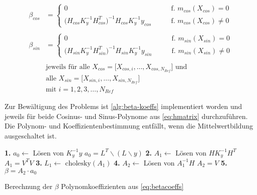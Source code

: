 \begin{align}\label{eq:betacoeffs}
	\beta_{cos} &= 
		\begin{cases}
			0 																	 &\qquad \text{f. } m_{cos}(X_{cos}) = 0\\
			\big( H_{cos} K_y^{-1} H_{cos}^T \big)^{-1} H_{cos} K_y^{-1} y_{cos} &\qquad \text{f. } m_{cos}(X_{cos}) \ne 0
		\end{cases} \nonumber \\
	\\
	\beta_{sin} &= 
		\begin{cases}
			0 																	 &\qquad \text{f. } m_{sin}(X_{sin}) = 0\\
			\big( H_{sin} K_y^{-1} H_{sin}^T \big)^{-1} H_{sin} K_y^{-1} y_{sin} &\qquad \text{f. } m_{sin}(X_{sin}) \ne 0
		\end{cases} \nonumber \\
	\nonumber \\
	& \text{jeweils für alle } X_{cos} = \big[ X_{cos,i},\dots, X_{cos,N_{Ref}} \big] \text{ und } \nonumber \\
	& \text{alle } X_{sin} = \big[ X_{sin,i},\dots, X_{sin,N_{Ref}} \big] \nonumber \\
	& \text{mit } i = 1,2,3,\ldots,N_{Ref} \nonumber
\end{align}


Zur Bewältigung des Problems ist \autoref{alg:beta-koeffs} implementiert worden und jeweils für beide Cosinus- und Sinus-Polynome aus \autoref{eq:hmatrix} durchzuführen. Die Polynom- und Koeffizientenbestimmung entfällt, wenn die Mittelwertbildung ausgeschaltet ist.


\begin{algorithm}[hp]
	\SetAlgoLined
	\textbf{1.} $a_0 \leftarrow$ Lösen von $K_y^{-1} y$\;
	\Indp 
		$a_0 = L^T \backslash (L \backslash y)$\;
	\Indm
	\textbf{2.} $A_1 \leftarrow$ Lösen von $H K_y^{-1} H^T$\;
	\Indp
		$A_1 = V^T V$\;
	\Indm
	\textbf{3.} $L_1 \leftarrow$ $\text{cholesky}(A_1)$\;
	\textbf{4.} $A_2 \leftarrow$ Lösen von $A_1^{-1} H$\;
	\Indp
		$A_2 = V$\;
	\Indm
	\textbf{5.} $\beta = A_2 \cdot a_0$\;
	\caption{Berechnung der $\beta$ Polynomkoeffizienten aus \autoref{eq:betacoeffs}}
	\label{alg:beta-koeffs}
\end{algorithm}


